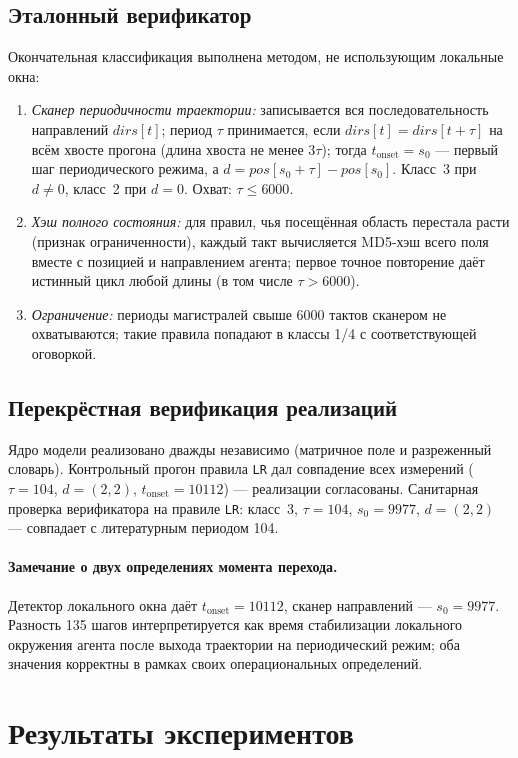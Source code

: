 \documentclass[12pt,a4paper]{article}
\begin{document}
	\subsection{Эталонный верификатор}
	Окончательная классификация выполнена методом, не использующим локальные окна:
	\begin{enumerate}
		\item \emph{Сканер периодичности траектории:} записывается вся последовательность направлений $dirs[t]$; период $\tau$ принимается, если $dirs[t]=dirs[t+\tau]$ на всём хвосте прогона (длина хвоста не менее $3\tau$); тогда $t_{\mathrm{onset}}=s_0$ --- первый шаг периодического режима, а $d=pos[s_0+\tau]-pos[s_0]$. Класс~3 при $d\neq0$, класс~2 при $d=0$. Охват: $\tau\le6000$.
		\item \emph{Хэш полного состояния:} для правил, чья посещённая область перестала расти (признак ограниченности), каждый такт вычисляется MD5-хэш всего поля вместе с позицией и направлением агента; первое точное повторение даёт истинный цикл любой длины (в том числе $\tau>6000$).
		\item \emph{Ограничение:} периоды магистралей свыше 6000 тактов сканером не охватываются; такие правила попадают в классы 1/4 с соответствующей оговоркой.
	\end{enumerate}
	
	\subsection{Перекрёстная верификация реализаций}
	Ядро модели реализовано дважды независимо (матричное поле и разреженный словарь). Контрольный прогон правила \texttt{LR} дал совпадение всех измерений ($\tau=104$, $d=(2,2)$, $t_{\mathrm{onset}}=10112$) --- реализации согласованы. Санитарная проверка верификатора на правиле \texttt{LR}: класс~3, $\tau=104$, $s_0=9977$, $d=(2,2)$ --- совпадает с литературным периодом 104.
	
	\paragraph{Замечание о двух определениях момента перехода.} 
	Детектор локального окна даёт $t_{\mathrm{onset}}=10112$, сканер направлений --- $s_0=9977$. Разность 135 шагов интерпретируется как время стабилизации локального окружения агента после выхода траектории на периодический режим; оба значения корректны в рамках своих операциональных определений.
	

	\section{Результаты экспериментов}
\end{document}
